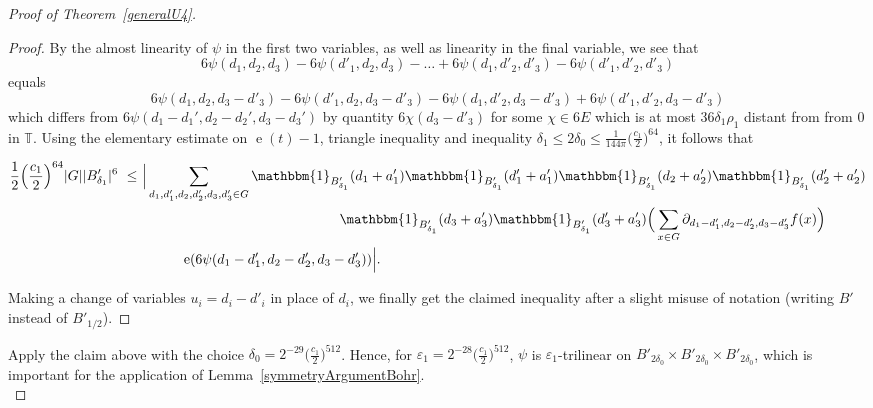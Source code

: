 \documentclass[a4paper,11pt]{article}
\numberwithin{theorem}{section}
\theoremstyle{definition}
\newcommand\id{\mathbbm{1}}
\newcommand{\on}[1]{
	\operatorname{#1}
}
\begin{document}
\begin{proof}[Proof of Theorem~\ref{generalU4}]
\begin{proof}
         By the almost linearity of $\psi$ in the first two variables, as well as linearity in the final variable, we see that 
         \[6\psi(d_1, d_2, d_3) - 6\psi(d'_1, d_2, d_3) - \dots + 6\psi(d_1, d'_2, d'_3) - 6\psi(d'_1, d'_2, d'_3)\]
         equals 
         \[6\psi(d_1, d_2, d_3-d'_3) - 6\psi(d'_1, d_2, d_3 - d'_3) -  6\psi(d_1, d'_2, d_3 - d'_3) + 6\psi(d'_1, d'_2, d_3 -d'_3)\]
         which differs from $6\psi(d_1 - d_1', d_2 - d_2', d_3 - d_3')$ by quantity $6\chi(d_3 - d'_3)$ for some $\chi \in 6E$ which is at most $36\delta_1\rho_1$ distant from from $0$ in $\mathbb{T}$. Using the elementary estimate on $\on{e}(t) - 1$, triangle inequality and inequality $\delta_1 \leq 2\delta_0 \leq \frac{1}{144\pi}\Big(\frac{c_1}{2}\Big)^{64}$, it follows that

         \begin{align*}\frac{1}{2}\Big(\frac{c_1}{2}\Big)^{64} |G| |B'_{\delta_1}|^6 \,\,\leq\,\, &\Big|\sum_{d_1,d_1', d_2,d_2', d_3,d_3' \in  G} \id_{B'_{\delta_1}}(d_1 + a'_1)\id_{B'_{\delta_1}}(d'_1 + a'_1) \id_{B'_{\delta_1}}(d_2 + a'_2)\id_{B'_{\delta_1}}(d'_2 + a'_2)\\
         &\hspace{5cm}\id_{B'_{\delta_1}}(d_3 + a'_3)\id_{B'_{\delta_1}}(d'_3 + a'_3)\Big(\sum_{x \in G} \partial_{d_1 - d_1', d_2 - d_2', d_3 - d_3'} f(x)\Big) \\
         &\hspace{1cm}\on{e}(6\psi(d_1 - d_1', d_2 - d_2', d_3 - d_3'))\Big|.\end{align*}

         Making a change of variables $u_i = d_i - d'_i$ in place of $d_i$, we finally get the claimed inequality after a slight misuse of notation (writing $B'$ instead of $B'_{1/2}$).
    \end{proof}

    Apply the claim above with the choice $\delta_0 = 2^{-29}\Big(\frac{c_1}{2}\Big)^{512}$. Hence, for $\varepsilon_1 = 2^{-28}\Big(\frac{c_1}{2}\Big)^{512}$, $\psi$ is $\varepsilon_1$-trilinear on $B'_{2\delta_0}\times B'_{2\delta_0} \times B'_{2\delta_0}$, which is important for the application of Lemma~\ref{symmetryArgumentBohr}.\\


\end{proof}
\end{document}
